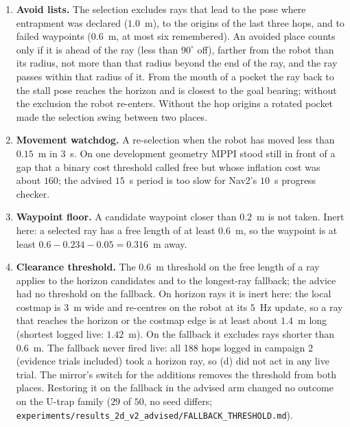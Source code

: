 \documentclass[journal]{IEEEtran}
\begin{document}
\begin{enumerate}
\item[(a)] \textbf{Avoid lists.} The selection excludes rays that lead to the pose where
  entrapment was declared ($1.0$~m), to the origins of the last three hops, and to failed
  waypoints ($0.6$~m, at most six remembered). An avoided place counts only if it is
  ahead of the ray (less than $90^\circ$ off), farther from the robot than its radius, not
  more than that radius beyond the end of the ray, and the ray passes within that radius of
  it. From the mouth of a pocket the ray
  back to the stall pose reaches the horizon and is closest to the goal bearing;
  without the exclusion the robot re-enters. Without the hop origins a rotated pocket
  made the selection swing between two places.
\item[(b)] \textbf{Movement watchdog.} A re-selection when the robot has moved less than
  $0.15$~m in $3$~s. On one development geometry MPPI stood still in front of a gap that a
  binary cost threshold called free but whose inflation cost was about $160$; the advised
  $15$~s period is too slow for Nav2's $10$~s progress checker.
\item[(c)] \textbf{Waypoint floor.} A candidate waypoint closer than $0.2$~m is not taken.
  Inert here: a selected ray has a free length of at least $0.6$~m, so the waypoint is at
  least $0.6-0.234-0.05=0.316$~m away.
\item[(d)] \textbf{Clearance threshold.} The $0.6$~m threshold on the free length of a ray
  applies to the horizon candidates and to the longest-ray fallback; the advice had no
  threshold on the fallback. On horizon rays it is inert here: the local costmap is $3$~m
  wide and re-centres on the robot at its $5$~Hz update, so a ray that reaches the horizon or
  the costmap edge is at least about $1.4$~m long (shortest logged live: $1.42$~m). On the
  fallback it excludes rays shorter than $0.6$~m. The fallback never fired live: all 188
  hops logged in campaign 2 (evidence trials included) took a horizon ray, so (d) did not act in
  any live trial. The mirror's switch for the additions removes
  the threshold from both places. Restoring it on the fallback in the advised arm changed no
  outcome on the U-trap family ($29$ of $50$, no seed differs;
  \texttt{experiments/results\_2d\_v2\_advised/}\allowbreak\texttt{FALLBACK\_THRESHOLD.md}).
\end{enumerate}
\end{document}

